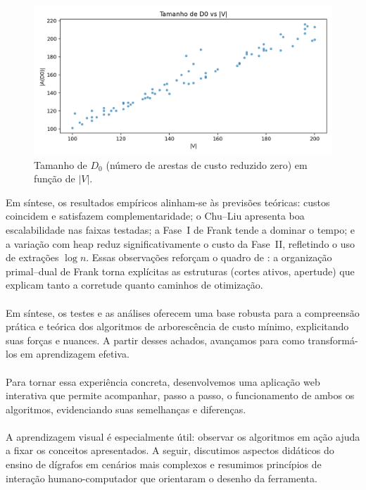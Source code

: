 \documentclass[12pt,a4paper]{article}
\def\emph#1{#1}%
\begin{document}
\begin{figure}[H]
    \centering
    \includegraphics[width=.75\linewidth]{figures/fig_d0_edges_vs_vertices.png}
    \caption{Tamanho de \(D_0\) (número de arestas de custo reduzido zero) em função de \(|V|\).}
    \label{fig:d0-vs-v}
\end{figure}

Em síntese, os resultados empíricos alinham-se às previsões teóricas: custos coincidem e satisfazem complementaridade; o \emph{Chu--Liu} apresenta boa escalabilidade nas faixas testadas; a Fase~I de Frank tende a dominar o tempo; e a variação com heap reduz significativamente o custo da Fase~II, refletindo o uso de extrações \(\log n\). Essas observações reforçam o quadro de \cite{frank2014,schrijver2003comb}: a organização primal--dual de Frank torna explícitas as estruturas (cortes ativos, apertude) que explicam tanto a corretude quanto caminhos de otimização.

\paragraph{}
Em síntese, os testes e as análises oferecem uma base robusta para a compreensão prática e teórica dos algoritmos de arborescência de custo mínimo, explicitando suas forças e nuances. A partir desses achados, avançamos para como transformá-los em aprendizagem efetiva.

\paragraph{}
Para tornar essa experiência concreta, desenvolvemos uma aplicação web interativa que permite acompanhar, passo a passo, o funcionamento de ambos os algoritmos, evidenciando suas semelhanças e diferenças.

\paragraph{}
A aprendizagem visual é especialmente útil: observar os algoritmos em ação ajuda a fixar os conceitos apresentados. A seguir, discutimos aspectos didáticos do ensino de dígrafos em cenários mais complexos e resumimos princípios de interação humano-computador que orientaram o desenho da ferramenta.
\end{document}
